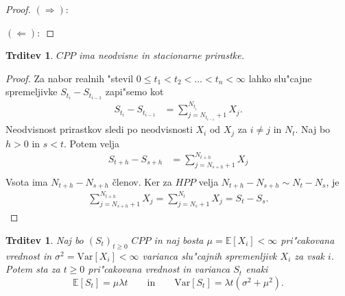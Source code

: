 \documentclass[12pt, a4paper, reqno]{amsart}
\theoremstyle{definition}
\theoremstyle{plain}
\newtheorem{trditev}[definicija]{Trditev}
\newcommand{\E}{\mathbb{E}}
\newcommand{\1}{\mathds{1}}
\newcommand{\Var}[1]{\text{Var}\left[#1\right]}
\begin{document}
        \begin{proof}
            $(\Rightarrow):$

            $(\Leftarrow):$
        \end{proof}

        \begin{trditev}
            $CPP$ ima neodvisne in stacionarne prirastke.
            \label{trd:neodvPrirCPP}
        \end{trditev}

        \begin{proof}
            Za nabor realnih "stevil $0 \leq t_1 < t_2 < \ldots < t_n < \infty$ lahko slu"cajne
            spremeljivke $S_{t_i} - S_{t_{i-1}}$ zapi"semo kot
            \begin{align*}
                S_{t_i} - S_{t_{i-1}} &= \sum_{j=N_{t_{i-1}}+1}^{N_{t_i}} X_j. 
            \end{align*}
            Neodvisnost prirastkov sledi po neodvisnosti $X_i$ od $X_j$ za $i\neq j$ in $N_t$. 
            Naj bo $h > 0$ in $s < t$. Potem velja
            \begin{align*}
                S_{t+h} - S_{s+h} &= \sum_{j=N_{s+h}+1}^{N_{t+h}} X_j \\
            \end{align*}
            Vsota ima $N_{t+h} - N_{s+h}$ členov. Ker za $HPP$ velja 
            $N_{t+h} - N_{s+h} \sim N_t - N_s$, je 
            \begin{align*}
                \sum_{j=N_{s+h}+1}^{N_{t+h}} X_j = \sum_{j=N_{s}+1}^{N_{t}} X_j = S_t - S_s.
            \end{align*}
        \end{proof}

        \begin{trditev}
            Naj bo $(S_t)_{t\geq 0}$ $CPP$ in naj bosta $\mu = \E\left[X_i\right] < \infty$ 
            pri"cakovana vrednost in $\sigma^2= \Var{X_i} <\infty$ varianca
            slu"cajnih spremenljivk $X_i$ za vsak $i$. Potem sta za $t\geq0$ pri"cakovana vrednost in 
            varianca $S_t$ enaki 
            \begin{equation*}
                \E\left[S_t\right] = \mu\lambda t \qquad \text{in} \qquad \Var{S_t} = \lambda t\left(\sigma^2 + \mu^2\right).
            \end{equation*}
            \label{trd:PricVarCPP}
        \end{trditev}
\end{document}
